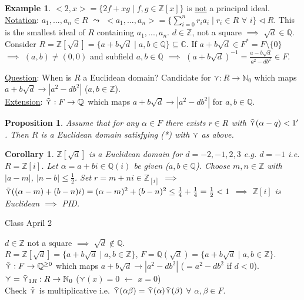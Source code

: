 \documentclass[11pt]{article}
\newtheorem{prop}[thm]{Proposition}
\newtheorem{cor}[thm]{Corollary}
\theoremstyle{definition}
\newtheorem{example}[thm]{Example}
\numberwithin{equation}{section}
\newcommand{\Q}{\mathbb{Q}}  %
\newcommand{\C}{\mathbb{C}}  %
\newcommand{\Z}{\mathbb{Z}}
\newcommand{\N}{\mathbb{N}} %
\begin{document}
\begin{example}
$<2, x> = \{2f + xg \mid f, g \in \Z[x]\}$ is \underline{not} a principal ideal. \underline{Notation}: $a_{1},...,a_{n} \in R$ $\leadsto$ $<a_{1},...,a_{n}> = \{\sum_{i=0}^{n}r_{i}a_{i} \mid r_{i} \in R$ $\forall$ $i \} \vartriangleleft R$. This is the smallest ideal of $R$ containing $a_{1},...,a_{n}$. $d \in \Z$, not a square $\implies$ $\sqrt{d} \in \Q$. Consider $R = \Z[\sqrt{d}] = \{a + b\sqrt{d} \mid a, b \in \Q\} \subseteq \C$. If $a + b\sqrt{d} \in F^{*} = F \setminus \{0\}$ $\implies$ $(a, b) \neq (0, 0)$ and subfield $a, b \in \Q$ $\implies$ $(a+b\sqrt{d})^{-1} = \frac{a-b\sqrt{d}}{a^{2}-db^{2}} \in F$.
\end{example}

\underline{Question}: When is $R$ a Euclidean domain? Candidate for $\curlyvee: R \rightarrow \N_{0}$ which maps $a+b\sqrt{d} \rightarrow |a^{2} - db^{2}|$ ($a, b \in \Z$).\\

\underline{Extension}: $\Tilde{\curlyvee}: F \rightarrow \Q$ which maps $a+b\sqrt{d} \rightarrow |a^{2} - db^{2}|$ for $a, b \in \Q$.

\begin{prop}
Assume that for any $\alpha \in F$ there exists $r \in R$ with $\Tilde{\curlyvee}(\alpha - q) < 1'$. Then $R$ is a Euclidean domain satisfying (*) with $\curlyvee$ as above.
\end{prop}

\begin{cor}
$\Z[\sqrt{d}]$ is a Euclidean domain for $d = -2, -1, 2, 3$ e.g. $d = -1$ i.e. $R = \Z[i]$. Let $\alpha = a + bi \in \Q(i)$ be given ($a, b \in \Q$). Choose $m, n \in \Z$ with $|a-m|$, $|n-b| \leq \frac{1}{2}$. Set $r = m+ni \in \Z_[i]$ $\implies$ $\Tilde{\curlyvee}((\alpha - m) + (b-n)i) = (\alpha - m)^{2} + (b-n)^{2} \leq \frac{1}{4} + \frac{1}{4} = \frac{1}{2} < 1$ $\implies$ $\Z[i]$ is Euclidean $\implies$ PID.
\end{cor}

\begin{center}
{\sf\LARGE Class April 2}
\end{center}

$d \in \Z$ not a square $\implies$ $\sqrt{d} \notin \Q$.\\
$R = \Z[\sqrt{d}] = \{a+b\sqrt{d} \mid a, b \in \Z\}$, $F = \Q(\sqrt{d}) = \{a+b\sqrt{d} \mid a, b \in \Z\}$.\\
$\Tilde{\curlyvee}: F \rightarrow \Q^{\geq 0}$ which maps $a+b\sqrt{d} \rightarrow |a^{2}-db^{2}|$ ($=a^{2}-db^{2}$ if $d < 0$).\\
$\curlyvee = \Tilde{\curlyvee}_{1R}: R \rightarrow \N_{0}$ ($\curlyvee(x) = 0$ $\longleftarrow$ $x = 0$)\\
Check $\Tilde{\curlyvee}$ is multiplicative i.e. $\Tilde{\curlyvee}(\alpha \beta) = \Tilde{\curlyvee}(\alpha)\Tilde{\curlyvee}(\beta)$ $\forall$ $\alpha, \beta \in F$.
\end{document}
